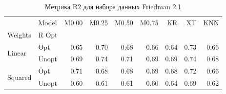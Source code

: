 \begin{table}
\caption{Метрика R2 для набора данных Friedman 2.1}
\label{tab:R2_Friedman 2.1}
\begin{tabular}{llrrrrrrr}
\toprule
 & Model & M0.00 & M0.25 & M0.50 & M0.75 & KR & XT & KNN \\
Weights & R Opt &  &  &  &  &  &  &  \\
\midrule
\multirow[t]{2}{*}{Linear} & Opt & 0.65 & 0.70 & 0.68 & 0.66 & 0.64 & 0.73 & 0.66 \\
 & Unopt & 0.69 & 0.74 & 0.71 & 0.69 & 0.69 & 0.74 & 0.68 \\

\multirow[t]{2}{*}{Squared} & Opt & 0.71 & 0.68 & 0.68 & 0.69 & 0.68 & 0.72 & 0.66 \\
 & Unopt & 0.60 & 0.61 & 0.61 & 0.60 & 0.64 & 0.69 & 0.62 \\

\bottomrule
\end{tabular}
\end{table}
